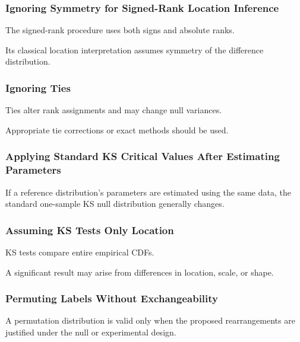 \subsubsection{Ignoring Symmetry for Signed-Rank Location Inference}

The signed-rank procedure uses both signs and absolute ranks.

Its classical location interpretation assumes symmetry of the difference
distribution.

\subsubsection{Ignoring Ties}

Ties alter rank assignments and may change null variances.

Appropriate tie corrections or exact methods should be used.

\subsubsection{Applying Standard KS Critical Values After Estimating Parameters}

If a reference distribution's parameters are estimated using the same
data, the standard one-sample KS null distribution generally changes.

\subsubsection{Assuming KS Tests Only Location}

KS tests compare entire empirical CDFs.

A significant result may arise from differences in location, scale, or
shape.

\subsubsection{Permuting Labels Without Exchangeability}

A permutation distribution is valid only when the proposed rearrangements
are justified under the null or experimental design.

